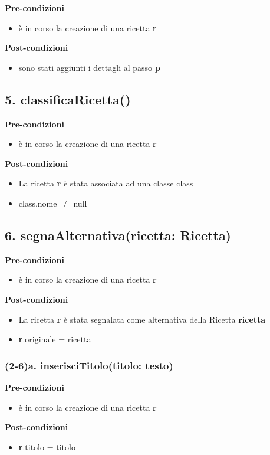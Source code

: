 \documentclass[14pt]{extarticle}
\begin{document}
\textbf{Pre-condizioni}
\begin{itemize}
  \item è in corso la creazione di una ricetta  \textbf{r}
\end{itemize}
\textbf{Post-condizioni}
\begin{itemize}
  \item sono stati aggiunti i dettagli al passo  \textbf{p}
\end{itemize}

\subsection*{5. classificaRicetta()}

\textbf{Pre-condizioni}
\begin{itemize}
  \item è in corso la creazione di una ricetta  \textbf{r}
\end{itemize}
\textbf{Post-condizioni}
\begin{itemize}
  \item La ricetta  \textbf{r} è stata associata ad una classe class
  \item class.nome $\neq$ null
\end{itemize}

\subsection*{6. segnaAlternativa(ricetta: Ricetta)}

\textbf{Pre-condizioni}
\begin{itemize}
  \item è in corso la creazione di una ricetta  \textbf{r}
\end{itemize}
\textbf{Post-condizioni}
\begin{itemize}
  \item La ricetta  \textbf{r} è stata segnalata come alternativa della Ricetta  \textbf{ricetta}
  \item \textbf{r}.originale = ricetta
\end{itemize}

\subsubsection*{(2-6)a. inserisciTitolo(titolo: testo)}

\textbf{Pre-condizioni}
\begin{itemize}
  \item è in corso la creazione di una ricetta  \textbf{r}
\end{itemize}
\textbf{Post-condizioni}
\begin{itemize}
  \item \textbf{r}.titolo = titolo
\end{itemize}
\end{document}
